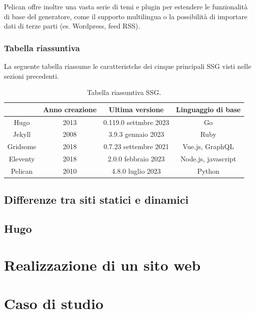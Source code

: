 \documentclass[target=bach,aauheader=]{thud}
\begin{document}
Pelican offre inoltre una vasta serie di temi e plugin per estendere le funzionalità di base del generatore, come il supporto multilingua o la possibilità di importare dati di terze parti (es. Wordpress, feed RSS).

\subsection{Tabella riassuntiva}
La seguente tabella riassume le caratteristche dei cinque principali SSG visti nelle sezioni precedenti.

\begin{table}[h]
    \centering
    \renewcommand{\arraystretch}{1.5}
    \begin{tabular}{|c|c|c|c|}
    \hline
     & Anno creazione & Ultima versione & Linguaggio di base \\
    \hline
    Hugo & 2013 & 0.119.0 settmbre 2023 & Go \\
    \hline
    Jekyll & 2008 & 3.9.3 gennaio 2023 & Ruby \\
    \hline
    Gridsome & 2018 & 0.7.23 settembre 2021 & Vue.js, GraphQL \\
    \hline
    Eleventy & 2018 & 2.0.0 febbraio 2023 & Node.js, javascript \\
    \hline
    Pelican & 2010 & 4.8.0 luglio 2023 & Python \\
    \hline
    \end{tabular}
    \caption{Tabella riassuntiva SSG.}
    \end{table}

\section{Differenze tra siti statici e dinamici}

\section{Hugo}\label{sec:hugo}

\chapter{Realizzazione di un sito web}

\chapter{Caso di studio}
\end{document}
